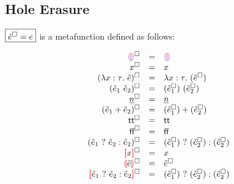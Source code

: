 \documentclass{article}
\begin{document}
\begin{mathpar}




\end{mathpar}

\subsection{Hole Erasure}
$\judgbox{\erase{\ECMV} = \EMV}$ is a metafunction defined as follows:

\newcommand{\erasesTo}[2]{\erase{#1} & = & #2}
\[\begin{array}{rcl}
  \erasesTo{\ECEHole}{\EEHole} \\
  \erasesTo{x}{x} \\
  \erasesTo{(\ECLam{x}{\TMV}{\ECMV})}{\ELam{x}{\TMV}{(\erase{\ECMV})}} \\
  \erasesTo{(\ECAp{\ECMV_1}{\ECMV_2})}{\EAp{(\erase{\ECMV_1})}{(\erase{\ECMV_2})}} \\
  \erasesTo{\ECIntMV}{\EIntMV} \\
  \erasesTo{(\ECPlus{\ECMV_1}{\ECMV_2})}{\EPlus{(\erase{\ECMV_1})}{(\erase{\ECMV_2})}} \\
  \erasesTo{\ECTrue}{\ETrue} \\
  \erasesTo{\ECFalse}{\EFalse} \\
  \erasesTo{(\ECIf{\ECMV_1}{\ECMV_2}{\ECMV_3})}{\EIf{(\erase{\ECMV_1})}{(\erase{\ECMV_2})}{(\erase{\ECMV_3})}} \\
  \erasesTo{\ECUnbound{x}}{x} \\
  \erasesTo{\ECInconType{\ECMV}}{\erase{\ECMV}} \\
  \erasesTo{\ECInconBr{\ECMV_1}{\ECMV_2}{\ECMV_3}}{\EIf{(\erase{\ECMV_1})}{(\erase{\ECMV_2})}{(\erase{\ECMV_3})}} \\
\end{array}\]
\end{document}
